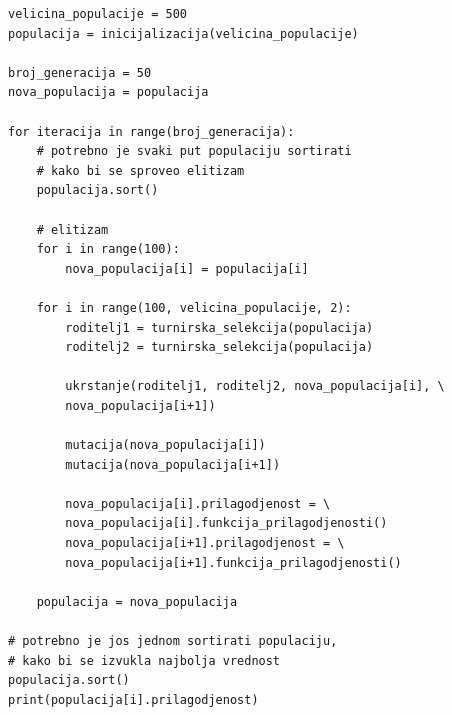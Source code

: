 \documentclass[a4paper]{article}
\begin{document}
\bigskip
\begin{lstlisting}[frame=single]
velicina_populacije = 500
populacija = inicijalizacija(velicina_populacije)

broj_generacija = 50
nova_populacija = populacija

for iteracija in range(broj_generacija):
    # potrebno je svaki put populaciju sortirati 
    # kako bi se sproveo elitizam 
    populacija.sort()

    # elitizam
    for i in range(100):
        nova_populacija[i] = populacija[i]

    for i in range(100, velicina_populacije, 2):
        roditelj1 = turnirska_selekcija(populacija)
        roditelj2 = turnirska_selekcija(populacija)

        ukrstanje(roditelj1, roditelj2, nova_populacija[i], \
        nova_populacija[i+1])

        mutacija(nova_populacija[i])
        mutacija(nova_populacija[i+1])

        nova_populacija[i].prilagodjenost = \
        nova_populacija[i].funkcija_prilagodjenosti()
        nova_populacija[i+1].prilagodjenost = \
        nova_populacija[i+1].funkcija_prilagodjenosti()

    populacija = nova_populacija

# potrebno je jos jednom sortirati populaciju, 
# kako bi se izvukla najbolja vrednost
populacija.sort()
print(populacija[i].prilagodjenost)
\end{lstlisting}
\end{document}
